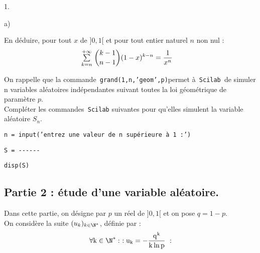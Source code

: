 \documentclass[11pt]{article}%
\begin{document}
\begin{noliste}{1.}
\begin{noliste}{a)}
\item En déduire, pour tout $x$ de $]0,1[$ et pour tout entier naturel
$n$ non nul : 
\begin{eqnarray*}
 & {\textstyle\sum\limits_{k = n}^{+ \infty}}\hspace{.1cm}\binom{k-1}{n-1}(1-x)^{k-n} = \frac{1}{x^{n}}
\end{eqnarray*}

\item On rappelle que la commande\texttt{ grand(1,n,'geom',p)}permet
à\texttt{
Scilab }de simuler n variables aléatoires indépendantes suivant toutes
la loi géométrique de paramètre $p$.~\\
 Compléter les commandes\texttt{ Scilab} suivantes pour qu'elles
simulent
la variable aléatoire $S_{n}.$ 
\end{noliste}

\texttt{n = input('entrez une valeur de n supérieure à 1 :')}


\texttt{S = -{}-{}-{}-{}-{}-}


\texttt{disp(S)}

\end{noliste}

\subsection*{{\normalsize{}{}{}Partie 2 : étude d'une variable
aléatoire.}}

Dans cette partie, on désigne par $p$ un réel de $]0,1[$ et on pose
$q = 1-p$.\\
 On considère la suite $(u_{k})_{k\in\N^{*}}$, définie par : 
\[
\mathrm{\forall k\in\N^{*} :\ :u_{k} = -\dfrac{q^{k}}{k\,ln\,p}\ :}
\]
\end{document}
